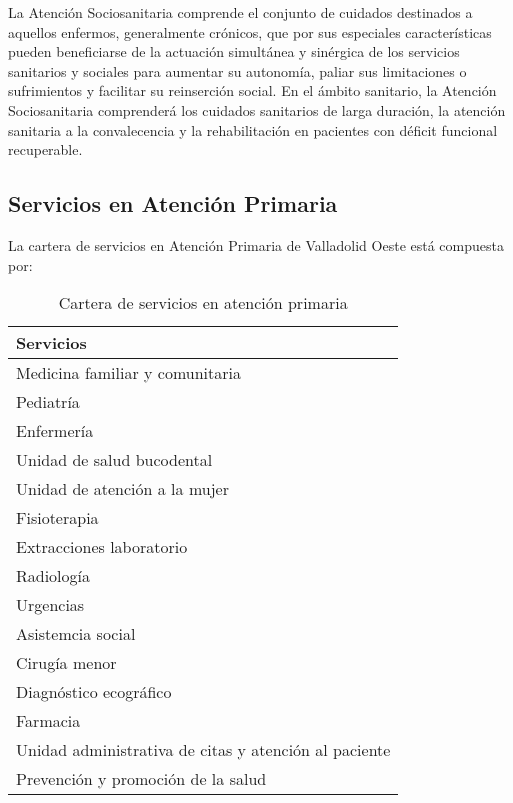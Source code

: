 La Atención Sociosanitaria comprende el conjunto de cuidados destinados a aquellos enfermos, generalmente crónicos, que por sus especiales características pueden beneficiarse de la actuación simultánea y sinérgica de los servicios sanitarios y sociales para aumentar su autonomía, paliar sus limitaciones o sufrimientos y facilitar su reinserción social. En el ámbito sanitario, la Atención Sociosanitaria comprenderá los cuidados sanitarios de larga duración, la atención sanitaria a la convalecencia y la rehabilitación en pacientes con déficit funcional recuperable.

\subsection{Servicios en Atención Primaria}

La cartera de servicios en Atención Primaria de Valladolid Oeste está compuesta por:

\begin{table}[H]
    \centering
    \begin{tabular}{l}
        \toprule
        Servicios                                             \\
        \midrule
        Medicina familiar y comunitaria                       \\
        Pediatría                                             \\
        Enfermería                                            \\
        Unidad de salud bucodental                            \\
        Unidad de atención a la mujer                         \\
        Fisioterapia                                          \\
        Extracciones laboratorio                              \\
        Radiología                                            \\
        Urgencias                                             \\
        Asistemcia social                                     \\
        Cirugía menor                                         \\
        Diagnóstico ecográfico                                \\
        Farmacia                                              \\
        Unidad administrativa de citas y atención al paciente \\
        Prevención y promoción de la salud                    \\
        \bottomrule
    \end{tabular}
    \caption{Cartera de servicios en atención primaria}
\end{table}


